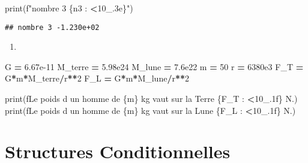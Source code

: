 \documentclass[
]{book}
\newenvironment{Shaded}{\begin{snugshade}}{\end{snugshade}}
\newcommand{\BuiltInTok}[1]{#1}
\newcommand{\DecValTok}[1]{\textcolor[rgb]{0.00,0.00,0.81}{#1}}
\newcommand{\FloatTok}[1]{\textcolor[rgb]{0.00,0.00,0.81}{#1}}
\newcommand{\NormalTok}[1]{#1}
\newcommand{\OperatorTok}[1]{\textcolor[rgb]{0.81,0.36,0.00}{\textbf{#1}}}
\newcommand{\SpecialCharTok}[1]{\textcolor[rgb]{0.00,0.00,0.00}{#1}}
\newcommand{\SpecialStringTok}[1]{\textcolor[rgb]{0.31,0.60,0.02}{#1}}
\providecommand{\tightlist}{%
  \setlength{\itemsep}{0pt}\setlength{\parskip}{0pt}}
\def\tightlist{}
\begin{document}
\begin{Shaded}
\begin{Highlighting}[]
\BuiltInTok{print}\NormalTok{(}\SpecialStringTok{f"nombre 3 }\SpecialCharTok{\{n3} \SpecialCharTok{:} \OperatorTok{\textless{}}\DecValTok{10}\SpecialCharTok{\_}\FloatTok{.3}\SpecialCharTok{e\}}\SpecialStringTok{"}\NormalTok{)}
\end{Highlighting}
\end{Shaded}

\begin{verbatim}
## nombre 3 -1.230e+02
\end{verbatim}

\begin{enumerate}
\def\labelenumi{\arabic{enumi}.}
\setcounter{enumi}{3}
\tightlist
\item
\end{enumerate}

\begin{Shaded}
\begin{Highlighting}[]
\NormalTok{G }\OperatorTok{=} \FloatTok{6.67e{-}11}
\NormalTok{M\_terre }\OperatorTok{=} \FloatTok{5.98e24}
\NormalTok{M\_lune }\OperatorTok{=} \FloatTok{7.6e22}
\NormalTok{m }\OperatorTok{=} \DecValTok{50}
\NormalTok{r }\OperatorTok{=} \FloatTok{6380e3}
\NormalTok{F\_T }\OperatorTok{=}\NormalTok{ G}\OperatorTok{*}\NormalTok{m}\OperatorTok{*}\NormalTok{M\_terre}\OperatorTok{/}\NormalTok{r}\OperatorTok{**}\DecValTok{2}
\NormalTok{F\_L }\OperatorTok{=}\NormalTok{ G}\OperatorTok{*}\NormalTok{m}\OperatorTok{*}\NormalTok{M\_lune}\OperatorTok{/}\NormalTok{r}\OperatorTok{**}\DecValTok{2}

\BuiltInTok{print}\NormalTok{(}\SpecialStringTok{f\textquotesingle{}Le poids d un homme de }\SpecialCharTok{\{m\}}\SpecialStringTok{ kg vaut sur la Terre }\SpecialCharTok{\{}\NormalTok{F\_T }\SpecialCharTok{:} \OperatorTok{\textless{}}\DecValTok{10}\SpecialCharTok{\_}\FloatTok{.1}\SpecialCharTok{f\}}\SpecialStringTok{ N.\textquotesingle{}}\NormalTok{)}
\BuiltInTok{print}\NormalTok{(}\SpecialStringTok{f\textquotesingle{}Le poids d un homme de }\SpecialCharTok{\{m\}}\SpecialStringTok{ kg vaut sur la Lune }\SpecialCharTok{\{}\NormalTok{F\_L }\SpecialCharTok{:} \OperatorTok{\textless{}}\DecValTok{10}\SpecialCharTok{\_}\FloatTok{.1}\SpecialCharTok{f\}}\SpecialStringTok{ N.\textquotesingle{}}\NormalTok{)}
\end{Highlighting}
\end{Shaded}

\hypertarget{structures-conditionnelles}{%
\chapter{Structures Conditionnelles}\label{structures-conditionnelles}}
\end{document}
